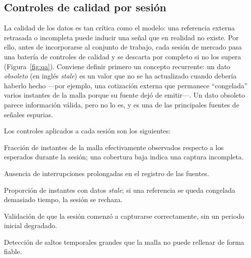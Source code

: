 \subsection{Controles de calidad por sesión}

La calidad de los datos es tan crítica como el modelo: una referencia externa retrasada o
incompleta puede inducir una señal que en realidad no existe. Por ello, antes de incorporarse
al conjunto de trabajo, cada sesión de mercado pasa una batería de controles de calidad y se
descarta por completo si no los supera (Figura~\ref{fig:qa}). Conviene definir primero un
concepto recurrente: un dato \emph{obsoleto} (en inglés \emph{stale}) es un valor que no se ha
actualizado cuando debería haberlo hecho —por ejemplo, una cotización externa que permanece
``congelada'' varios instantes de la malla porque su fuente dejó de emitir—. Un dato obsoleto
parece información válida, pero no lo es, y es una de las principales fuentes de señales
espurias.

Los controles aplicados a cada sesión son los siguientes:
\begin{description}[noitemsep, leftmargin=2.6cm, font=\bfseries]
\item[Cobertura] Fracción de instantes de la malla efectivamente observados respecto a los
esperados durante la sesión; una cobertura baja indica una captura incompleta.
\item[Continuidad] Ausencia de interrupciones prolongadas en el registro de las fuentes.
\item[Obsolescencia] Proporción de instantes con datos \emph{stale}; si una referencia se
queda congelada demasiado tiempo, la sesión se rechaza.
\item[Arranque] Validación de que la sesión comenzó a capturarse correctamente, sin un
periodo inicial degradado.
\item[Huecos severos] Detección de saltos temporales grandes que la malla no puede rellenar
de forma fiable.
\end{description}

